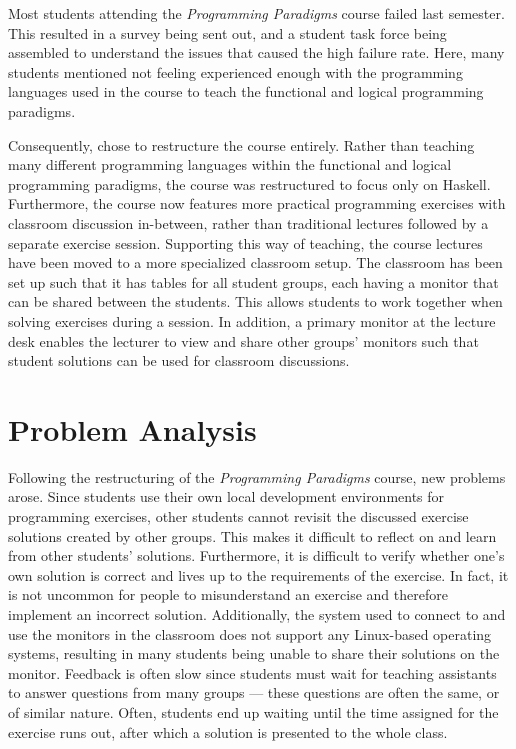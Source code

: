 Most students attending the \textit{Programming Paradigms} course failed last semester.
This resulted in a survey being sent out, and a student task force being assembled to understand the issues that caused the high failure rate.
Here, many students mentioned not feeling experienced enough with the programming languages used in the course to teach the functional and logical programming paradigms.

Consequently, \aau{} chose to restructure the course entirely.
Rather than teaching many different programming languages within the functional and logical programming paradigms, the course was restructured to focus only on Haskell.
Furthermore, the course now features more practical programming exercises with classroom discussion in-between, rather than traditional lectures followed by a separate exercise session.
Supporting this way of teaching, the course lectures have been moved to a more specialized classroom setup. The classroom has been set up such that it has tables for all student groups, each having a monitor that can be shared between the students. This allows students to work together when solving exercises during a session.
In addition, a primary monitor at the lecture desk enables the lecturer to view and share other groups' monitors such that student solutions can be used for classroom discussions.


\section{Problem Analysis}
Following the restructuring of the \textit{Programming Paradigms} course, new problems arose.
Since students use their own local development environments for programming exercises, other students cannot revisit the discussed exercise solutions created by other groups.
This makes it difficult to reflect on and learn from other students' solutions.
Furthermore, it is difficult to verify whether one's own solution is correct and lives up to the requirements of the exercise.
In fact, it is not uncommon for people to misunderstand an exercise and therefore implement an incorrect solution.
Additionally, the system used to connect to and use the monitors in the classroom does not support any Linux-based operating systems, resulting in many students being unable to share their solutions on the monitor.
Feedback is often slow since students must wait for teaching assistants to answer questions from many groups --- these questions are often the same, or of similar nature.
Often, students end up waiting until the time assigned for the exercise runs out, after which a solution is presented to the whole class.

